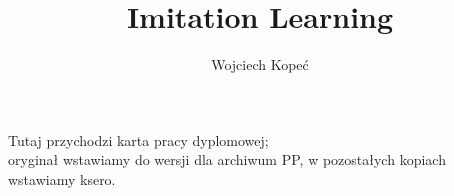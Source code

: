 \documentclass[polish,master,a4paper,oneside]{ppfcmthesis}
\author{%
   Wojciech Kopeć \album{101675} \and
}
\title{Imitation Learning}                   %
\begin{document}
\frontmatter\pagestyle{empty}%
\maketitle\cleardoublepage%

\thispagestyle{empty}\vspace*{\fill}%
\begin{center}Tutaj przychodzi karta pracy dyplomowej;\\oryginał wstawiamy do wersji dla archiwum PP, w pozostałych kopiach wstawiamy ksero.\end{center}%
\vfill\cleardoublepage%

\pagestyle{ppfcmthesis}%
\tableofcontents* \cleardoublepage%

\mainmatter%



\cleardoublepage\appendix%
%
%

{\raggedright\sloppy\small}

\ppcolophon
\end{document}
